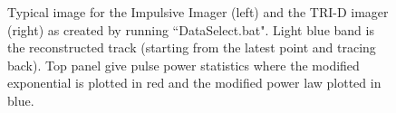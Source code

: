 \begin{figure}[th]
	\caption{Typical image for the Impulsive Imager (left) and the TRI-D imager (right) as created by running ``DataSelect.bat". Light blue band is the reconstructed track (starting from the latest point and tracing back). Top panel give pulse power statistics where the modified exponential is plotted in red and the modified power law plotted in blue.}	 
\end{figure}


